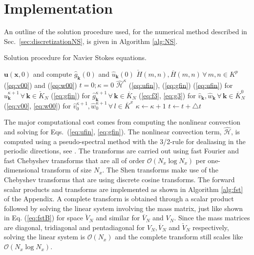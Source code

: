 \documentclass[11pt, oneside]{elsarticle}
\newcommand{\N}[1]{\check{#1}}
\newcommand{\D}[1]{\overline{#1}}
\begin{document}
\section{Implementation}
\label{sec:implementation}
An outline of the solution procedure used, for the numerical method described in Sec.~\ref{sec:discretizationNS}, is given in Algorithm \ref{alg:NS}.
\begin{algorithm}
	\caption{Solution procedure for Navier Stokes equations.     \label{alg:NS}}
    \begin{algorithmic}[1]
    	\State {} $\bm{u}(\bm{x}, 0)$ and compute 
    	$\hat{g}_{\bm{k}}(0)$ and $\hat{u}_{\bm{k}}(0)$
		\State {} $\N{H}(m,n), \D{H}(m,n) 
		\,\forall \, m, n \in K^p$
		\State {} (\ref{eq:v00}) and (\ref{eq:w00})
		\State $t=0; {\kappa}=0$
	    	\State {} $\bm{\hat{\mathcal{H}}}^{\kappa}$
	    	\State {}(\ref{eq:ufin}), 
	    	(\ref{eq:gfin})
		    \State {}(\ref{eq:ufin}) for 
		    $\hat{u}^{{\kappa}+1}_{\bm{k}} \, \forall \,\bm{k} \in \N{K}_N$
		    \State {}(\ref{eq:gfin}) for 
		    $\hat{g}^{{\kappa}+1}_{\bm{k}} \, \forall\, \bm{k} \in \D{K}_N$
		    \State {}(\ref{eq:f3}, \ref{eq:g3}) for  
		    $\hat{v}_{\bm{k}}, \hat{w}_{\bm{k}}\, \forall\, \bm{k} 
		    \in \D{K}_N^0$
		    \State {}(\ref{eq:v00}, \ref{eq:w00}) for 
		    $\hat{v}_0^{{\kappa}+1}, \hat{w}_0^{{\kappa}+1}\, 
		    \forall \, l \in \D{K}^x$
		    \State ${\kappa} \gets {\kappa} + 1$
		    \State $t \gets t+\triangle t$
		    \State {}
	    \EndWhile 
	    	
    \end{algorithmic}
\end{algorithm}
The major computational cost comes from  computing the nonlinear convection 
and solving for Eqs.~(\ref{eq:ufin}, \ref{eq:gfin}). The nonlinear 
convection 
term, $\bm{\hat{\mathcal{H}}}$, is computed using a pseudo-spectral method with 
the 3/2-rule for dealiasing in the periodic directions, see \cite{canuto1988}. The 
transforms are carried out using fast Fourier and fast Chebyshev transforms 
that are all of order $\mathcal{O}(N_x\log N_x)$ per one-dimensional transform of size 
$N_x$. The Shen transforms make use of the Chebyshev transforms that are using 
discrete cosine transforms. The forward scalar products and transforms are implemented as shown 
in Algorithm \ref{alg:fst} of the Appendix. A complete transform is obtained through a scalar 
product followed by solving the linear system involving the mass 
matrix, just like shown in Eq. (\ref{eq:fstB}) for space $\N{V}_N$ and similar 
for $\D{V}_N$ and $V_N$. Since the mass matrices are diagonal, tridiagonal and 
pentadiagonal for $V_N, \D{V}_N$ and $\N{V}_N$ respectively, solving the linear 
system is $\mathcal{O}(N_x)$ and the complete transform still scales like $\mathcal{O}(N_x\log N_x)$. 
\end{document}
